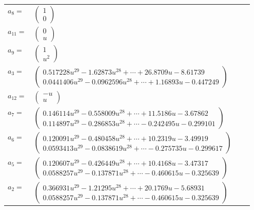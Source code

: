 \documentclass[1p]{elsarticle_modified}
\theoremstyle{definition}
\begin{document}
\begin{tabular}{m{7pt} m{180pt} m{7pt} m{180pt} }
\flushright $a_{8}=$&$\begin{pmatrix}1\\0\end{pmatrix}$ \\
\flushright $a_{11}=$&$\begin{pmatrix}0\\u\end{pmatrix}$ \\
\flushright $a_{9}=$&$\begin{pmatrix}1\\u^2\end{pmatrix}$ \\
\flushright $a_{3}=$&$\begin{pmatrix}0.517228 u^{29}-1.62873 u^{28}+\cdots+26.8709 u-8.61739\\0.0441406 u^{29}-0.0962596 u^{28}+\cdots+1.16893 u-0.447249\end{pmatrix}$ \\
\flushright $a_{12}=$&$\begin{pmatrix}- u\\u\end{pmatrix}$ \\
\flushright $a_{7}=$&$\begin{pmatrix}0.146114 u^{29}-0.558009 u^{28}+\cdots+11.5186 u-3.67862\\0.114897 u^{29}-0.286853 u^{28}+\cdots-0.242495 u-0.299101\end{pmatrix}$ \\
\flushright $a_{6}=$&$\begin{pmatrix}0.120091 u^{29}-0.480458 u^{28}+\cdots+10.2319 u-3.49919\\0.0593413 u^{29}-0.0838619 u^{28}+\cdots-0.275735 u-0.299617\end{pmatrix}$ \\
\flushright $a_{5}=$&$\begin{pmatrix}0.120607 u^{29}-0.426449 u^{28}+\cdots+10.4168 u-3.47317\\0.0588257 u^{29}-0.137871 u^{28}+\cdots-0.460615 u-0.325639\end{pmatrix}$ \\
\flushright $a_{2}=$&$\begin{pmatrix}0.366931 u^{29}-1.21295 u^{28}+\cdots+20.1769 u-5.68931\\0.0588257 u^{29}-0.137871 u^{28}+\cdots-0.460615 u-0.325639\end{pmatrix}$ \\

\end{tabular}
\end{document}
